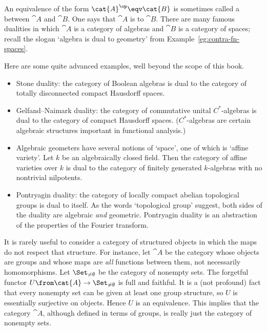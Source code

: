 \begin{example}
An equivalence of the form $\cat{A}^\op \eqv \cat{B}$ is sometimes called a
%
%
%
between $\cat{A}$ and $\cat{B}$.  One says that $\cat{A}$ is 
to $\cat{B}$.  There are many famous dualities in which $\cat{A}$ is a
category of algebras and $\cat{B}$ is a category of spaces; recall the
slogan `algebra is dual%
%
%
to geometry' from Example~\ref{eg:contra-fn-spaces}.

Here are some quite advanced examples, well beyond the scope of this book.
% 
\begin{itemize}
\item 
Stone duality:%
%
%
the category of Boolean%
%
%
algebras is dual to the category of totally disconnected compact Hausdorff
spaces.

\item 
Gelfand--Naimark duality:%
%
%
the category of commutative unital $C^*$-algebras%
%
%
is dual to the category of compact Hausdorff spaces.  ($C^*$-algebras are
certain algebraic structures important in functional analysis.)

\item 
Algebraic geometers%
%
%
have several notions of `space', one of which is `affine variety'.%
%
%
Let $k$ be an algebraically closed field.  Then the category of affine
varieties over $k$ is dual to the category of finitely generated
$k$-algebras with no nontrivial nilpotents.

\item 
Pontryagin duality:%
%
%
the category of locally compact abelian topological%
%
%
\linebreak
%
groups is dual to itself.  As the words `topological group' suggest, both
sides of the duality are algebraic \emph{and} geometric.  Pontryagin
duality is an abstraction of the properties of the Fourier%
%
%
transform.
\end{itemize}
\end{example}


\begin{example}
It is rarely useful to consider a category of structured objects in
which the maps do not respect that structure.  For instance, let $\cat{A}$
be the category whose objects are groups%
%
%
and whose maps are \emph{all} functions between them, not necessarily
homomorphisms.  Let $\Set_{\neq\emptyset}$ be the category of nonempty
sets.  The forgetful functor $U\from \cat{A} \to \Set_{\neq\emptyset}$ is
full and faithful.  It is a (not profound) fact that every nonempty set can
be given at least one group structure, so $U$ is essentially surjective on
objects.  Hence $U$ is an equivalence.  This implies that the category
$\cat{A}$, although defined in terms of groups, is really just the category
of nonempty sets.
\end{example}

